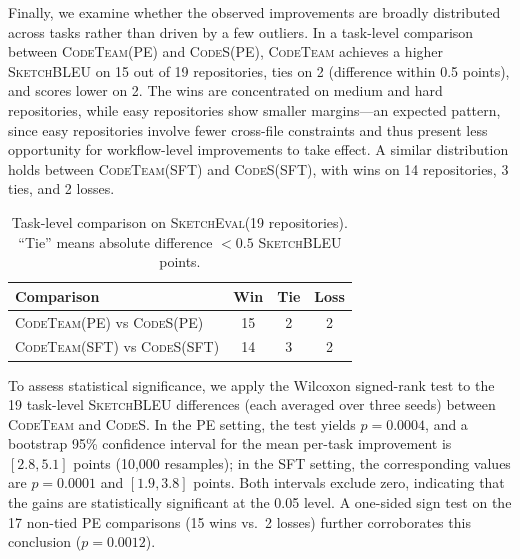\documentclass[format=acmsmall, review=false, screen=true]{acmart}
\newcommand{\tool}{\textsc{CodeTeam}\xspace}
\newcommand{\codes}{\textsc{CodeS}\xspace}
\newcommand{\sketcheval}{\textsc{SketchEval}\xspace}
\newcommand{\sketchbleu}{\textsc{SketchBLEU}\xspace}
\begin{document}
Finally, we examine whether the observed improvements are broadly distributed across tasks rather than driven by a few outliers.
In a task-level comparison between \tool (PE) and \codes (PE), \tool achieves a higher \sketchbleu on 15 out of 19 repositories, ties on 2 (difference within 0.5 points), and scores lower on 2.
The wins are concentrated on medium and hard repositories, while easy repositories show smaller margins---an expected pattern, since easy repositories involve fewer cross-file constraints and thus present less opportunity for workflow-level improvements to take effect.
A similar distribution holds between \tool (SFT) and \codes (SFT), with wins on 14 repositories, 3 ties, and 2 losses.

\begin{table}[t]
\centering
\small
\caption{Task-level comparison on \sketcheval (19 repositories). ``Tie'' means absolute difference $<0.5$ \sketchbleu points.}
\label{tab:rq1-winloss}
\begin{tabular}{@{}lccc@{}}
\toprule
Comparison & Win & Tie & Loss \\
\midrule
\tool (PE) vs \codes (PE) & 15 & 2 & 2 \\
\tool (SFT) vs \codes (SFT) & 14 & 3 & 2 \\
\bottomrule
\end{tabular}
\end{table}

To assess statistical significance, we apply the Wilcoxon signed-rank test to the 19 task-level \sketchbleu differences (each averaged over three seeds) between \tool and \codes.
In the PE setting, the test yields $p = 0.0004$, and a bootstrap 95\% confidence interval for the mean per-task improvement is $[2.8, 5.1]$ points (10{,}000 resamples); in the SFT setting, the corresponding values are $p = 0.0001$ and $[1.9, 3.8]$ points.
Both intervals exclude zero, indicating that the gains are statistically significant at the 0.05 level.
A one-sided sign test on the 17 non-tied PE comparisons (15 wins vs.\ 2 losses) further corroborates this conclusion ($p = 0.0012$).
\end{document}
